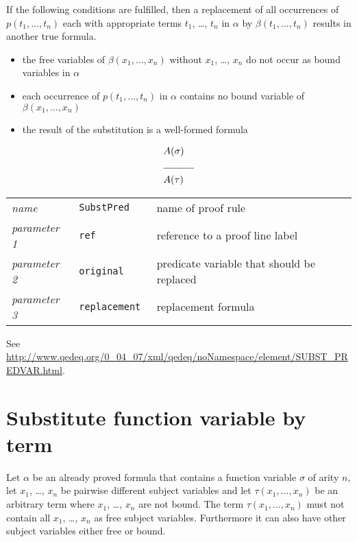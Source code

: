 \documentclass[a4paper,german,10pt,twoside]{book}
\theoremstyle{definition}
\theoremstyle{remark}
\begin{document}
If the following conditions are fulfilled, then a replacement of all occurrences of $p(t_1, \ldots, t_n)$ each with appropriate terms $t_1$, \ldots, $t_n$ in $\alpha$ by $\beta(t_1, \ldots, t_n)$ results in another true formula.

\begin{itemize}

\item
the free variables of $\beta(x_1, \ldots, x_n)$ without $x_1$, \ldots, $x_n$ do not occur as bound variables in $\alpha$ 

\item 
each occurrence of $p(t_1, \ldots, t_n)$ in $\alpha$ contains no bound variable of $\beta(x_1, \ldots, x_n)$ 

\item
the result of the substitution is a well-formed formula

\end{itemize}

\par
\begin{eqnarray*}
 & A(\sigma) & \\
 \cline{2-3}
 & A(\tau) & \\
\end{eqnarray*}

\par
\begin{tabularx}{\columnwidth}{lll}
  \emph{name}        & \tt{SubstPred}   & name of proof rule \\
  \emph{parameter 1} & \tt{ref}         & reference to a proof line label \\
  \emph{parameter 2} & \tt{original}    & predicate variable that should be replaced \\
  \emph{parameter 3} & \tt{replacement} & replacement formula 
\end{tabularx}

\par
See \url{http://www.qedeq.org/0_04_07/xml/qedeq/noNamespace/element/SUBST_PREDVAR.html}.

\section{Substitute function variable by term} \label{chapter6_section6} \hypertarget{chapter6_section6}{}
Let $\alpha$ be an already proved formula that contains a function variable $\sigma$ of arity $n$, let $x_1$, \ldots, $x_n$ be pairwise different subject variables and let $\tau(x_1, \ldots, x_n)$ be an arbitrary term where $x_1$, \ldots, $x_n$ are not bound. 
The term $\tau(x_1, \ldots, x_n)$ must not contain all $x_1$, \ldots, $x_n$ as free subject variables. Furthermore it can also have other subject variables either free or bound. 
\end{document}
